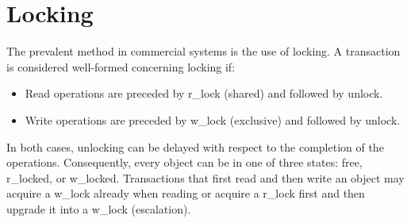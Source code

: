 \section{Locking}

The prevalent method in commercial systems is the use of locking. 
A transaction is considered well-formed concerning locking if:
\begin{itemize}
    \item Read operations are preceded by r\_lock (shared) and followed by unlock. 
    \item Write operations are preceded by w\_lock (exclusive) and followed by unlock. 
\end{itemize}
In both cases, unlocking can be delayed with respect to the completion of the operations. 
Consequently, every object can be in one of three states: free, r\_locked, or w\_locked.
Transactions that first read and then write an object may acquire a w\_lock already when reading or acquire a r\_lock first and then upgrade it into a w\_lock (escalation).


